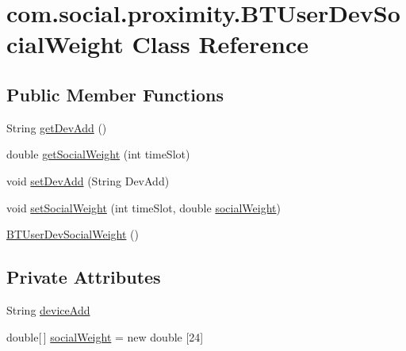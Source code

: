 \hypertarget{classcom_1_1social_1_1proximity_1_1_b_t_user_dev_social_weight}{}\section{com.\+social.\+proximity.\+B\+T\+User\+Dev\+Social\+Weight Class Reference}
\label{classcom_1_1social_1_1proximity_1_1_b_t_user_dev_social_weight}
\subsection*{Public Member Functions}
\begin{DoxyCompactItemize}
\item 
String \hyperlink{classcom_1_1social_1_1proximity_1_1_b_t_user_dev_social_weight_ac43ee131c00bcaba9c442fbbc5d8d73b}{get\+Dev\+Add} ()
\item 
double \hyperlink{classcom_1_1social_1_1proximity_1_1_b_t_user_dev_social_weight_aa6ac848fd00e9bd3ecc358976cce2887}{get\+Social\+Weight} (int time\+Slot)
\item 
void \hyperlink{classcom_1_1social_1_1proximity_1_1_b_t_user_dev_social_weight_a0b2623c737f32c304f5f5a5fbd6294cc}{set\+Dev\+Add} (String Dev\+Add)
\item 
void \hyperlink{classcom_1_1social_1_1proximity_1_1_b_t_user_dev_social_weight_ae7cd53c451c6b3394113e423252bdcc9}{set\+Social\+Weight} (int time\+Slot, double \hyperlink{classcom_1_1social_1_1proximity_1_1_b_t_user_dev_social_weight_a9acca1b321aa087c5529f7d7e1e62419}{social\+Weight})
\item 
\hyperlink{classcom_1_1social_1_1proximity_1_1_b_t_user_dev_social_weight_a56b407d38a92d8b8e8c9331ea401268a}{B\+T\+User\+Dev\+Social\+Weight} ()
\end{DoxyCompactItemize}
\subsection*{Private Attributes}
\begin{DoxyCompactItemize}
\item 
String \hyperlink{classcom_1_1social_1_1proximity_1_1_b_t_user_dev_social_weight_add70ba47ccfd7def7cb1cd17a502d798}{device\+Add}
\item 
double\mbox{[}$\,$\mbox{]} \hyperlink{classcom_1_1social_1_1proximity_1_1_b_t_user_dev_social_weight_a9acca1b321aa087c5529f7d7e1e62419}{social\+Weight} = new double \mbox{[}24\mbox{]}
\end{DoxyCompactItemize}


